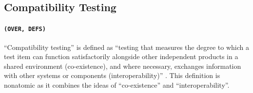 

\subsection{Compatibility Testing}\label{compat-flaw}

\paragraph{\texttt{(OVER, DEFS)}}
``Compatibility testing'' is defined as ``testing that measures the
degree to which a test item can function satisfactorily alongside
other independent products in a shared environment (co-existence),
and where necessary, exchanges information with other systems or
components (interoperability)'' \citep[p.~3]{IEEE2022}. This
definition is nonatomic as it combines the ideas of ``co-existence''
and ``interoperability''.


